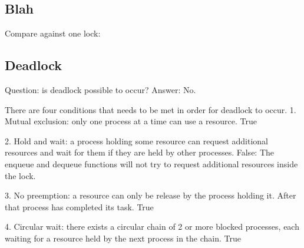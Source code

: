\documentclass[a4paper,11pt,twoside,fleqn]{article}
\begin{document}
\subsection*{Blah}

Compare against one lock:

\subsection*{Deadlock}

Question: is deadlock possible to occur? Answer: No.

There are four conditions that needs to be met in order for deadlock to occur.
1. Mutual exclusion: only one process at a time can use a resource.
True

2. Hold and wait: a process holding some resource can request additional resources and wait for them if they are held by other processes.
False: The enqueue and dequeue functions will not try to request additional resources inside the lock.

3. No preemption: a resource can only be release by the process holding it. After that process has completed its task.
True

4. Circular wait: there exists a circular chain of 2 or more blocked processes, each waiting for a resource held by the next process in the chain.
True


\end{document}

